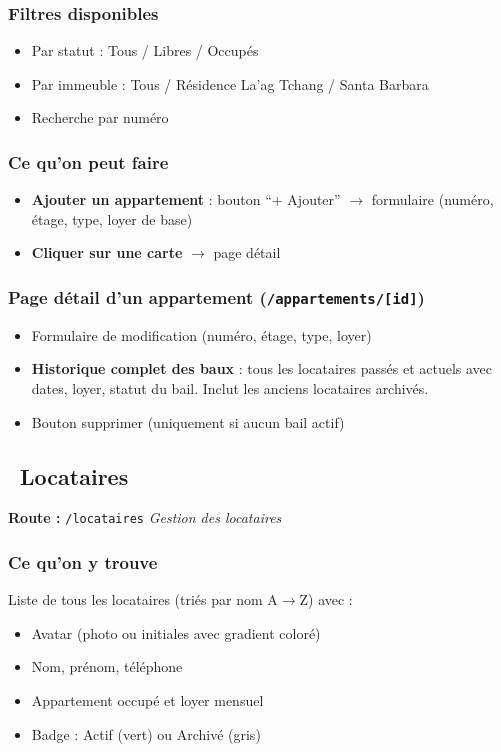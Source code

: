 \documentclass[12pt,a4paper]{article}
\begin{document}
\subsubsection{Filtres disponibles}
\begin{itemize}
\item Par statut : Tous / Libres / Occup\'es
\item Par immeuble : Tous / R\'esidence La'ag Tchang / Santa Barbara
\item Recherche par num\'ero
\end{itemize}

\subsubsection{Ce qu'on peut faire}
\begin{itemize}
\item \textbf{Ajouter un appartement} : bouton ``+ Ajouter'' $\rightarrow$ formulaire (num\'ero, \'etage, type, loyer de base)
\item \textbf{Cliquer sur une carte} $\rightarrow$ page d\'etail
\end{itemize}

\subsubsection{Page d\'etail d'un appartement (\texttt{/appartements/[id]})}
\begin{itemize}
\item Formulaire de modification (num\'ero, \'etage, type, loyer)
\item \textbf{Historique complet des baux} : tous les locataires pass\'es et actuels avec dates, loyer, statut du bail. Inclut les anciens locataires archiv\'es.
\item Bouton supprimer (uniquement si aucun bail actif)
\end{itemize}

\subsection{\faUser\ Locataires}
\textbf{Route :} \texttt{/locataires} \hfill \textit{Gestion des locataires}

\subsubsection{Ce qu'on y trouve}
Liste de tous les locataires (tri\'es par nom A$\rightarrow$Z) avec :
\begin{itemize}
\item Avatar (photo ou initiales avec gradient color\'e)
\item Nom, pr\'enom, t\'el\'ephone
\item Appartement occup\'e et loyer mensuel
\item Badge : Actif (vert) ou Archiv\'e (gris)
\end{itemize}
\end{document}
